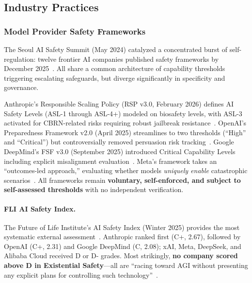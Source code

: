 \subsection{Industry Practices}
\label{sec:gov-industry}

\subsubsection{Model Provider Safety Frameworks}
\label{sec:gov-frameworks}

The Seoul AI Safety Summit (May 2024) catalyzed a concentrated burst of self-regulation: twelve frontier AI companies published safety frameworks by December 2025~\cite{metr2025frameworks}. All share a common architecture of capability thresholds triggering escalating safeguards, but diverge significantly in specificity and governance.

Anthropic's Responsible Scaling Policy (RSP v3.0, February 2026) defines AI Safety Levels (ASL-1 through ASL-4+) modeled on biosafety levels, with ASL-3 activated for CBRN-related risks requiring robust jailbreak resistance~\cite{anthropicrsp3}. OpenAI's Preparedness Framework v2.0 (April 2025) streamlines to two thresholds (``High'' and ``Critical'') but controversially removed persuasion risk tracking~\cite{openaiprepv2}. Google DeepMind's FSF v3.0 (September 2025) introduced Critical Capability Levels including explicit misalignment evaluation~\cite{googlefsf3}. Meta's framework takes an ``outcomes-led approach,'' evaluating whether models \emph{uniquely enable} catastrophic scenarios~\cite{metafrontier2025}. All frameworks remain \textbf{voluntary, self-enforced, and subject to self-assessed thresholds} with no independent verification.

\paragraph{FLI AI Safety Index.}
The Future of Life Institute's AI Safety Index (Winter 2025) provides the most systematic external assessment~\cite{fli2025winter}. Anthropic ranked first (C+, 2.67), followed by OpenAI (C+, 2.31) and Google DeepMind (C, 2.08); xAI, Meta, DeepSeek, and Alibaba Cloud received D or D- grades. Most strikingly, \textbf{no company scored above D in Existential Safety}---all are ``racing toward AGI without presenting any explicit plans for controlling such technology''~\cite{fli2025winter}.

